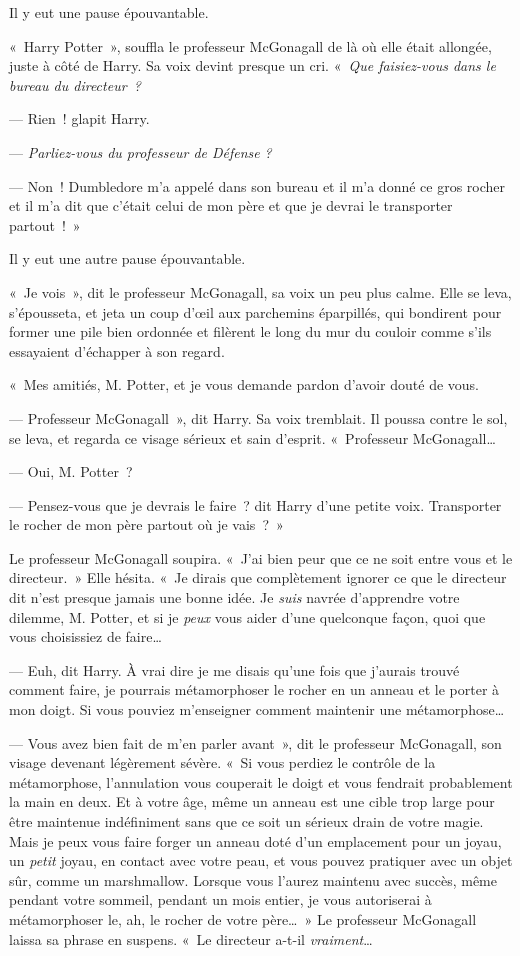Il y eut une pause épouvantable.

«~Harry Potter~», souffla le professeur McGonagall de là où elle était allongée, juste à côté de Harry. Sa voix devint presque un cri. «~\emph{Que faisiez-vous dans le bureau du directeur~?}

--- Rien~! glapit Harry.

--- \emph{Parliez-vous du professeur de Défense} \emph{?}

--- Non~! Dumbledore m'a appelé dans son bureau et il m'a donné ce gros rocher et il m'a dit que c'était celui de mon père et que je devrai le transporter partout~!~»

Il y eut une autre pause épouvantable.

«~Je vois~», dit le professeur McGonagall, sa voix un peu plus calme. Elle se leva, s'épousseta, et jeta un coup d'œil aux parchemins éparpillés, qui bondirent pour former une pile bien ordonnée et filèrent le long du mur du couloir comme s'ils essayaient d'échapper à son regard.

«~Mes amitiés, M. Potter, et je vous demande pardon d'avoir douté de vous.

--- Professeur McGonagall~», dit Harry. Sa voix tremblait. Il poussa contre le sol, se leva, et regarda ce visage sérieux et sain d'esprit. «~Professeur McGonagall…

--- Oui, M. Potter~?

--- Pensez-vous que je devrais le faire~? dit Harry d'une petite voix. Transporter le rocher de mon père partout où je vais~?~»

Le professeur McGonagall soupira. «~J'ai bien peur que ce ne soit entre vous et le directeur.~» Elle hésita. «~Je dirais que complètement ignorer ce que le directeur dit n'est presque jamais une bonne idée. Je \emph{suis} navrée d'apprendre votre dilemme, M. Potter, et si je \emph{peux} vous aider d'une quelconque façon, quoi que vous choisissiez de faire…

--- Euh, dit Harry. À vrai dire je me disais qu'une fois que j'aurais trouvé comment faire, je pourrais métamorphoser le rocher en un anneau et le porter à mon doigt. Si vous pouviez m'enseigner comment maintenir une métamorphose…

--- Vous avez bien fait de m'en parler avant~», dit le professeur McGonagall, son visage devenant légèrement sévère. «~Si vous perdiez le contrôle de la métamorphose, l'annulation vous couperait le doigt et vous fendrait probablement la main en deux. Et à votre âge, même un anneau est une cible trop large pour être maintenue indéfiniment sans que ce soit un sérieux drain de votre magie. Mais je peux vous faire forger un anneau doté d'un emplacement pour un joyau, un \emph{petit} joyau, en contact avec votre peau, et vous pouvez pratiquer avec un objet sûr, comme un marshmallow. Lorsque vous l'aurez maintenu avec succès, même pendant votre sommeil, pendant un mois entier, je vous autoriserai à métamorphoser le, ah, le rocher de votre père…~» Le professeur McGonagall laissa sa phrase en suspens. «~Le directeur a-t-il \emph{vraiment}…

